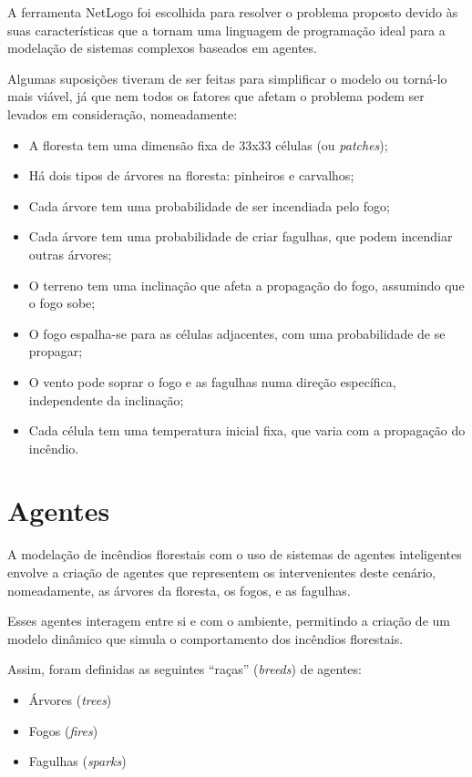 A ferramenta NetLogo foi escolhida para resolver o problema proposto devido às suas características que a tornam uma linguagem de programação ideal para a modelação de sistemas complexos baseados em agentes.

Algumas suposições tiveram de ser feitas para simplificar o modelo ou torná-lo mais viável, já que nem todos os fatores que afetam o problema podem ser levados em consideração, nomeadamente:
\begin{itemize}
    \item A floresta tem uma dimensão fixa de 33x33 células (ou \textit{patches});
    \item Há dois tipos de árvores na floresta: pinheiros e carvalhos;
    \item Cada árvore tem uma probabilidade de ser incendiada pelo fogo;
    \item Cada árvore tem uma probabilidade de criar fagulhas, que podem incendiar outras árvores;
    \item O terreno tem uma inclinação que afeta a propagação do fogo, assumindo que o fogo sobe;
    \item O fogo espalha-se para as células adjacentes, com uma probabilidade de se propagar;
    \item O vento pode soprar o fogo e as fagulhas numa direção específica, independente da inclinação;
    \item Cada célula tem uma temperatura inicial fixa, que varia com a propagação do incêndio.
\end{itemize}


\section{Agentes}\label{sec:agents}

A modelação de incêndios florestais com o uso de sistemas de agentes inteligentes envolve a criação de agentes que representem os intervenientes deste cenário, nomeadamente, as árvores da floresta, os fogos, e as fagulhas.

Esses agentes interagem entre si e com o ambiente, permitindo a criação de um modelo dinâmico que simula o comportamento dos incêndios florestais.

Assim, foram definidas as seguintes ``raças'' (\textit{breeds}) de agentes:
\begin{itemize}
    \item Árvores (\textit{trees})
    \item Fogos (\textit{fires})
    \item Fagulhas (\textit{sparks})
\end{itemize}

